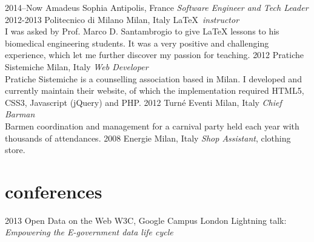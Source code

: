 \documentclass[]{friggeri-cv} %
\begin{document}
\begin{entrylist}
\entry
{2014--Now}
{Amadeus}
{Sophia Antipolis, France}
{\emph{Software Engineer and Tech Leader} \\
}
\entry
{2012-2013}
{Politecnico di Milano}
{Milan, Italy}
{\LaTeX~\emph{instructor} \\
I was asked by Prof. Marco D. Santambrogio to give \LaTeX{} lessons to his biomedical engineering students.
It was a very positive and challenging experience, which let me further discover my passion for teaching.
}
\entry
{2012}
{Pratiche Sistemiche}
{Milan, Italy}
{\emph{Web Developer} \\
Pratiche Sistemiche is a counselling association based in Milan. I developed and currently
  maintain their website, of which the implementation required HTML5, CSS3, Javascript (jQuery)
  and PHP.
}
\entry
{2012}
{Turné Eventi}
{Milan, Italy}
{\emph{Chief Barman} \\
Barmen coordination and management for a carnival party held each year with thousands of attendances.
}
\entry
{2008}
{Energie}
{Milan, Italy}
{\emph{Shop Assistant}, clothing store.}
\end{entrylist}


\section{conferences}

\begin{entrylist}
\entry
{2013}
{Open Data on the Web}
{W3C, Google Campus London}
{Lightning talk: \emph{Empowering the E-government data life cycle}}
\end{entrylist}


\end{document}
